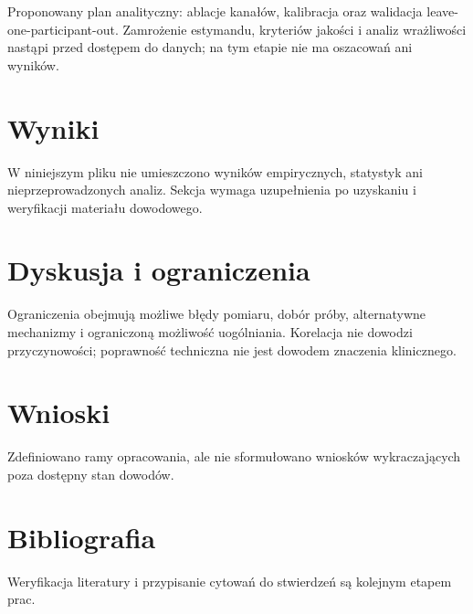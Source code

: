 \documentclass[11pt,a4paper]{article}
\begin{document}
Proponowany plan analityczny: ablacje kanałów, kalibracja oraz walidacja leave-one-participant-out. Zamrożenie estymandu, kryteriów jakości i analiz wrażliwości nastąpi przed dostępem do danych; na tym etapie nie ma oszacowań ani wyników.

\section{Wyniki}

W niniejszym pliku nie umieszczono wyników empirycznych, statystyk ani nieprzeprowadzonych analiz. Sekcja wymaga uzupełnienia po uzyskaniu i weryfikacji materiału dowodowego.

\section{Dyskusja i ograniczenia}

Ograniczenia obejmują możliwe błędy pomiaru, dobór próby, alternatywne mechanizmy i ograniczoną możliwość uogólniania. Korelacja nie dowodzi przyczynowości; poprawność techniczna nie jest dowodem znaczenia klinicznego.

\section{Wnioski}

Zdefiniowano ramy opracowania, ale nie sformułowano wniosków wykraczających poza dostępny stan dowodów.

\section*{Bibliografia}

Weryfikacja literatury i przypisanie cytowań do stwierdzeń są kolejnym etapem prac.
\end{document}
